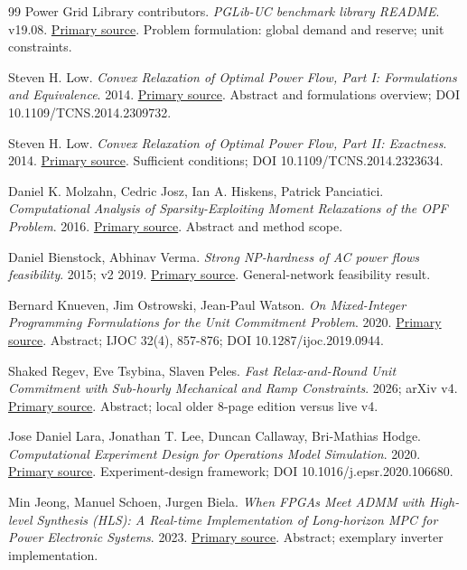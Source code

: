 \documentclass[11pt,letterpaper]{article}
\begin{document}
\begin{thebibliography}{99}
 Power Grid Library contributors. \emph{PGLib-UC benchmark library README}. v19.08. \href{https://github.com/power-grid-lib/pglib-uc/blob/master/README.md}{Primary source}. Problem formulation: global demand and reserve; unit constraints.

 Steven H. Low. \emph{Convex Relaxation of Optimal Power Flow, Part I: Formulations and Equivalence}. 2014. \href{https://arxiv.org/abs/1405.0766}{Primary source}. Abstract and formulations overview; DOI 10.1109/TCNS.2014.2309732.

 Steven H. Low. \emph{Convex Relaxation of Optimal Power Flow, Part II: Exactness}. 2014. \href{https://arxiv.org/abs/1405.0814}{Primary source}. Sufficient conditions; DOI 10.1109/TCNS.2014.2323634.

 Daniel K. Molzahn, Cedric Josz, Ian A. Hiskens, Patrick Panciatici. \emph{Computational Analysis of Sparsity-Exploiting Moment Relaxations of the OPF Problem}. 2016. \href{https://arxiv.org/abs/1603.05188}{Primary source}. Abstract and method scope.

 Daniel Bienstock, Abhinav Verma. \emph{Strong NP-hardness of AC power flows feasibility}. 2015; v2 2019. \href{https://arxiv.org/abs/1512.07315}{Primary source}. General-network feasibility result.

 Bernard Knueven, Jim Ostrowski, Jean-Paul Watson. \emph{On Mixed-Integer Programming Formulations for the Unit Commitment Problem}. 2020. \href{https://optimization-online.org/wp-content/uploads/2018/11/6930.pdf}{Primary source}. Abstract; IJOC 32(4), 857-876; DOI 10.1287/ijoc.2019.0944.

 Shaked Regev, Eve Tsybina, Slaven Peles. \emph{Fast Relax-and-Round Unit Commitment with Sub-hourly Mechanical and Ramp Constraints}. 2026; arXiv v4. \href{https://arxiv.org/abs/2602.03977}{Primary source}. Abstract; local older 8-page edition versus live v4.

 Jose Daniel Lara, Jonathan T. Lee, Duncan Callaway, Bri-Mathias Hodge. \emph{Computational Experiment Design for Operations Model Simulation}. 2020. \href{https://arxiv.org/abs/2004.11517}{Primary source}. Experiment-design framework; DOI 10.1016/j.epsr.2020.106680.

 Min Jeong, Manuel Schoen, Jurgen Biela. \emph{When FPGAs Meet ADMM with High-level Synthesis (HLS): A Real-time Implementation of Long-horizon MPC for Power Electronic Systems}. 2023. \href{https://www.research-collection.ethz.ch/server/api/core/bitstreams/63c29e96-9bf9-4714-a4e3-cd4dc4fb8bde/content}{Primary source}. Abstract; exemplary inverter implementation.


\end{thebibliography}
\end{document}
